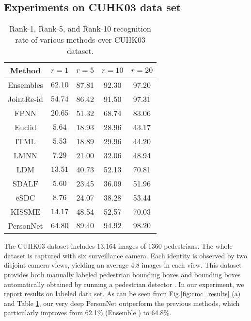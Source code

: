 \documentclass[10pt,journal,twocolumn]{IEEEtran}
\begin{document}
\subsection{Experiments on CUHK03 data set}\begin{table}[t]
  \centering
  \caption{Rank-1, Rank-5, and Rank-10 recognition rate of various methods over CUHK03 dataset. }  \label{tab:cmc_cuhk03}{
  \begin{tabular}{c|c|c|c|c}
  \hline
\hline
    Method  & $r=1$  &  $r=5$ & $r=10$  & $r=20$ \\
  \hline\hline
   Ensembles \cite{paul2015ensemble}  & $62.10$ &  87.81 & 92.30 & 97.20 \\
   JointRe-id \cite{JointRe-id}  & $54.74$ & 86.42 & 91.50 & 97.31 \\
   FPNN \cite{FPNN} & $20.65$ & 51.32 & 68.74 & 83.06\\
   Euclid  & $5.64$ & 18.93 &28.96 & 43.17 \\
   ITML \cite{Davis2007Information} & $5.53$ & 18.89 &29.96 & 44.20 \\
   LMNN \cite{Hirzer2012Person} & $7.29$ & 21.00 & 32.06& 48.94 \\
   LDM \cite{Guillaumin2009Isthatyou} & $13.51$ & 40.73 &52.13 & 70.81 \\
   SDALF \cite{Farenzena2010Person} & $5.60$ & 23.45 &36.09 & 51.96 \\
   eSDC \cite{Zhao2013Unsupervised} & $8.76$ & 24.07 &38.28 & 53.44 \\
   KISSME \cite{Kostinger2012Large} & $14.17$ & 48.54 &52.57 & 70.03 \\
\hline
   PersonNet   &  $\mathbf{64.80}$ &  $\mathbf{89.40}$ & $\mathbf{94.92}$ &  $\mathbf{98.20}$ \\
  \hline
  \end{tabular}
  }
\end{table}The CUHK03 dataset includes 13,164 images of 1360 pedestrians. The whole dataset is captured with six surveillance camera. Each identity is observed by two disjoint camera views, yielding an average 4.8 images in each view. This dataset provides both manually labeled pedestrian bounding boxes and bounding boxes automatically obtained by running a pedestrian detector \cite{DetectionPAMI}. In our experiment, we report results on labeled data set. As can be seen from Fig.\ref{fig:cmc_results} (a) and Table \ref{tab:cmc_cuhk03}, our very deep PersonNet outperform the previous methods, which particularly improves from 62.1\% (Ensemble \cite{paul2015ensemble}) to 64.8\%.
\end{document}
